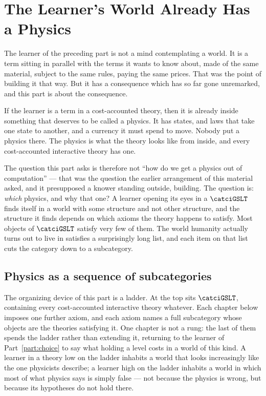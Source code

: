 \chapter{The Learner's World Already Has a Physics}
\label{sec:causality-intro}

The learner of the preceding part is not a mind contemplating a world.
It is a term sitting in parallel with the terms it wants to know about,
made of the same material, subject to the same rules, paying the same
prices.
That was the point of building it that way.
But it has a consequence which has so far gone unremarked, and this part
is about the consequence.

If the learner is a term in a cost-accounted theory, then it is already
inside something that deserves to be called a physics.
It has states, and laws that take one state to another, and a currency it
must spend to move.
Nobody put a physics there.
The physics is what the theory looks like from inside, and every
cost-accounted interactive theory has one.

The question this part asks is therefore not ``how do we get a physics
out of computation'' --- that was the question the earlier arrangement of
this material asked, and it presupposed a knower standing outside,
building.
The question is: \emph{which} physics, and why that one?
A learner opening its eyes in a $\catciGSLT$ finds itself in a world with
some structure and not other structure, and the structure it finds
depends on which axioms the theory happens to satisfy.
Most objects of $\catciGSLT$ satisfy very few of them.
The world humanity actually turns out to live in satisfies a
surprisingly long list, and each item on that list cuts the category
down to a subcategory.

\section{Physics as a sequence of subcategories}
\label{sec:physics-ladder}

The organizing device of this part is a ladder.
At the top sits $\catciGSLT$, containing every cost-accounted interactive
theory whatever.
Each chapter below imposes one further axiom, and each axiom names a full
subcategory whose objects are the theories satisfying it.
One chapter is not a rung: the last of them spends the ladder rather than
extending it, returning to the learner of Part~\ref{part:choice} to say
what holding a level costs in a world of this kind.
A learner in a theory low on the ladder inhabits a world that looks
increasingly like the one physicists describe; a learner high on the
ladder inhabits a world in which most of what physics says is simply
false --- not because the physics is wrong, but because its hypotheses do
not hold there.

